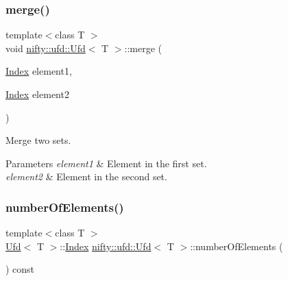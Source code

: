 \subsubsection{\texorpdfstring{merge()}{merge()}}
{\footnotesize\ttfamily template$<$class T $>$ \\
void \hyperlink{classnifty_1_1ufd_1_1Ufd}{nifty\+::ufd\+::\+Ufd}$<$ T $>$\+::merge (\begin{DoxyParamCaption}\item[{\hyperlink{classnifty_1_1ufd_1_1Ufd_a0a9a7ab02b6d77fb2035234cbda8b3a7}{Index}}]{element1,  }\item[{\hyperlink{classnifty_1_1ufd_1_1Ufd_a0a9a7ab02b6d77fb2035234cbda8b3a7}{Index}}]{element2 }\end{DoxyParamCaption})\hspace{0.3cm}{\ttfamily [inline]}}

Merge two sets.


\begin{DoxyParams}{Parameters}
{\em element1} & Element in the first set. \\
\hline
{\em element2} & Element in the second set. \\
\hline
\end{DoxyParams}
\mbox{\label{classnifty_1_1ufd_1_1Ufd_a12fb9fc1558fe27c2f1dd8e55b3ac626}} 
\subsubsection{\texorpdfstring{number\+Of\+Elements()}{numberOfElements()}}
{\footnotesize\ttfamily template$<$class T $>$ \\
\hyperlink{classnifty_1_1ufd_1_1Ufd}{Ufd}$<$ T $>$\+::\hyperlink{classnifty_1_1ufd_1_1Ufd_a0a9a7ab02b6d77fb2035234cbda8b3a7}{Index} \hyperlink{classnifty_1_1ufd_1_1Ufd}{nifty\+::ufd\+::\+Ufd}$<$ T $>$\+::number\+Of\+Elements (\begin{DoxyParamCaption}{ }\end{DoxyParamCaption}) const\hspace{0.3cm}{\ttfamily [inline]}}

\mbox{\label{classnifty_1_1ufd_1_1Ufd_af2f635e155734ede82204da4080b8e5e}} 
